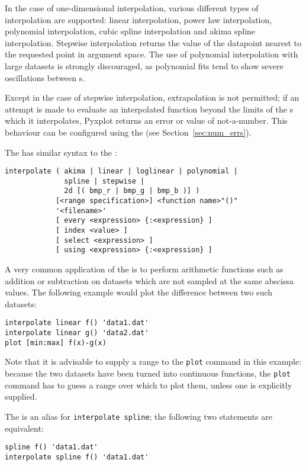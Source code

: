 In the case of one-dimensional interpolation, various different types of
interpolation are supported: linear interpolation, power law interpolation,
polynomial interpolation, cubic spline interpolation and akima spline
interpolation. Stepwise interpolation returns the value of the datapoint
nearest to the requested point in argument space. The use of polynomial
interpolation with large datasets is strongly discouraged, as polynomial fits
tend to show severe oscillations between \datapoint s.

Except in the case of stepwise interpolation, extrapolation is not permitted;
if an attempt is made to evaluate an interpolated function beyond the limits of
the \datapoint s which it interpolates, Pyxplot returns an error or value of
not-a-number.  This behaviour can be configured using the  (see Section~\ref{sec:num_errs}).

The  has similar syntax to the :

\begin{verbatim}
interpolate ( akima | linear | loglinear | polynomial |
              spline | stepwise |
              2d [( bmp_r | bmp_g | bmp_b )] )
            [<range specification>] <function name>"()"
            '<filename>'
            [ every <expression> {:<expression} ]
            [ index <value> ]
            [ select <expression> ]
            [ using <expression> {:<expression} ]
\end{verbatim}

A very common application of the  is to perform arithmetic
functions such as addition or subtraction on datasets which are not sampled at
the same abscissa values. The following example would plot the difference
between two such datasets:

\begin{verbatim}
interpolate linear f() 'data1.dat'
interpolate linear g() 'data2.dat'
plot [min:max] f(x)-g(x)
\end{verbatim}

\noindent Note that it is advisable to supply a range to the {\tt plot} command
in this example: because the two datasets have been turned into continuous
functions, the {\tt plot} command has to guess a range over which to plot them,
unless one is explicitly supplied.

The  is an alias for {\tt interpolate spline}; the following
two statements are equivalent:

\begin{verbatim}
spline f() 'data1.dat'
interpolate spline f() 'data1.dat'
\end{verbatim}

